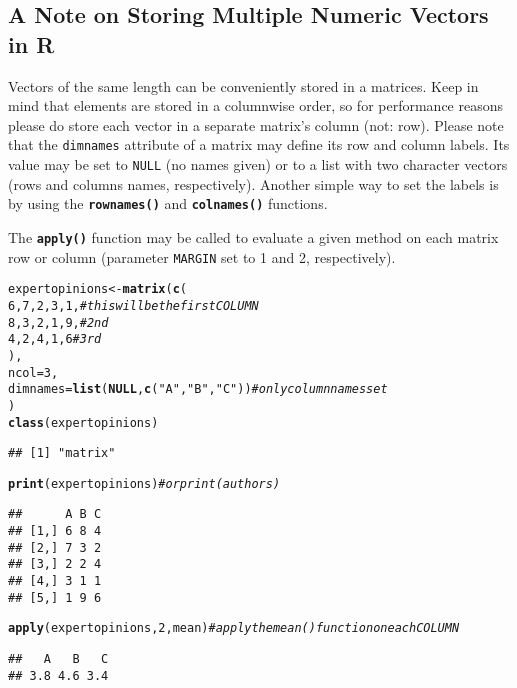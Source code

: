 \documentclass[11pt]{article}\usepackage[]{graphicx}\usepackage[]{color}
\makeatletter
\newcommand{\hlnum}[1]{\textcolor[rgb]{0.686,0.059,0.569}{#1}}%
\newcommand{\hlstr}[1]{\textcolor[rgb]{0.192,0.494,0.8}{#1}}%
\newcommand{\hlcom}[1]{\textcolor[rgb]{0.678,0.584,0.686}{\textit{#1}}}%
\newcommand{\hlstd}[1]{\textcolor[rgb]{0.345,0.345,0.345}{#1}}%
\newcommand{\hlkwa}[1]{\textcolor[rgb]{0.161,0.373,0.58}{\textbf{#1}}}%
\newcommand{\hlkwb}[1]{\textcolor[rgb]{0.69,0.353,0.396}{#1}}%
\newcommand{\hlkwc}[1]{\textcolor[rgb]{0.333,0.667,0.333}{#1}}%
\newcommand{\hlkwd}[1]{\textcolor[rgb]{0.737,0.353,0.396}{\textbf{#1}}}%
\newenvironment{kframe}{%
 \def\at@end@of@kframe{}%
 \ifinner\ifhmode%
  \def\at@end@of@kframe{\end{minipage}}%
  \begin{minipage}{\columnwidth}%
 \fi\fi%
 \def\FrameCommand##1{\hskip\@totalleftmargin \hskip-\fboxsep
 \colorbox{shadecolor}{##1}\hskip-\fboxsep
     \hskip-\linewidth \hskip-\@totalleftmargin \hskip\columnwidth}%
 \MakeFramed {\advance\hsize-\width
   \@totalleftmargin\z@ \linewidth\hsize
   \@setminipage}}%
 {\par\unskip\endMakeFramed%
 \at@end@of@kframe}
\newenvironment{knitrout}{}{} %
\newcommand{\lang}[1]{\textsf{#1}\xspace}
\newcommand{\R}{\lang{R}}
\newcommand{\Rfunc}[1]{\texttt{\hlkwd{#1}}}
\newcommand{\argument}[1]{\texttt{\hlkwc{#1}}}
\theoremstyle{remark}
\theoremstyle{definition}
\makeatother
\begin{document}
\subsection{A Note on Storing Multiple Numeric Vectors in \R}

Vectors of the same length can be conveniently stored in a matrices.
Keep in mind that elements are stored in a columnwise order,
so for performance reasons please do store each vector in
a separate matrix's column (not: row).
Please note
that the \argument{dimnames} attribute of a matrix may define
its row and column labels.
Its value may be set to \texttt{NULL}
(no names given) or to a list with two character
vectors (rows and columns names, respectively).
Another simple way to set the labels is by using
the \Rfunc{rownames()} and \Rfunc{colnames()} functions.

The \Rfunc{apply()} function may be called to evaluate
a given method on each matrix row  or column
(parameter \argument{MARGIN} set to 1 and 2, respectively).


\begin{knitrout}\small
{}\color{fgcolor}\begin{kframe}
\begin{alltt}
\hlstd{expertopinions} \hlkwb{<-} \hlkwd{matrix}\hlstd{(}\hlkwd{c}\hlstd{(}
      \hlnum{6}\hlstd{,}\hlnum{7}\hlstd{,}\hlnum{2}\hlstd{,}\hlnum{3}\hlstd{,}\hlnum{1}\hlstd{,} \hlcom{# this will be the first COLUMN}
      \hlnum{8}\hlstd{,}\hlnum{3}\hlstd{,}\hlnum{2}\hlstd{,}\hlnum{1}\hlstd{,}\hlnum{9}\hlstd{,} \hlcom{# 2nd}
      \hlnum{4}\hlstd{,}\hlnum{2}\hlstd{,}\hlnum{4}\hlstd{,}\hlnum{1}\hlstd{,}\hlnum{6}  \hlcom{# 3rd}
   \hlstd{),}
   \hlkwc{ncol}\hlstd{=}\hlnum{3}\hlstd{,}
   \hlkwc{dimnames}\hlstd{=}\hlkwd{list}\hlstd{(}\hlkwa{NULL}\hlstd{,} \hlkwd{c}\hlstd{(}\hlstr{"A"}\hlstd{,} \hlstr{"B"}\hlstd{,} \hlstr{"C"}\hlstd{))} \hlcom{# only column names set}
\hlstd{)}
\hlkwd{class}\hlstd{(expertopinions)}
\end{alltt}
\begin{verbatim}
## [1] "matrix"
\end{verbatim}
\begin{alltt}
\hlkwd{print}\hlstd{(expertopinions)}   \hlcom{# or print(authors)}
\end{alltt}
\begin{verbatim}
##      A B C
## [1,] 6 8 4
## [2,] 7 3 2
## [3,] 2 2 4
## [4,] 3 1 1
## [5,] 1 9 6
\end{verbatim}
\begin{alltt}
\hlkwd{apply}\hlstd{(expertopinions,} \hlnum{2}\hlstd{, mean)} \hlcom{#  apply the mean() function on each COLUMN}
\end{alltt}
\begin{verbatim}
##   A   B   C 
## 3.8 4.6 3.4
\end{verbatim}
\end{kframe}
\end{knitrout}
\end{document}
